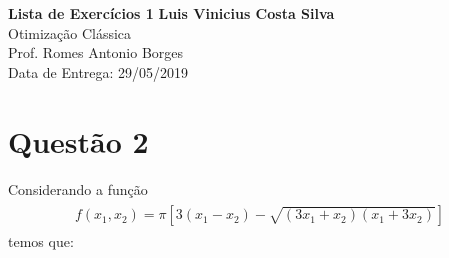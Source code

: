 \documentclass[fleqn, 11pt]{article}
\begin{document}
\noindent
\large\textbf{Lista de Exercícios 1} \hfill \textbf{Luis Vinicius Costa Silva} \\
\normalsize Otimização Clássica \\
Prof. Romes Antonio Borges \\
\hfill Data de Entrega: 29/05/2019






\section*{Questão 2}
Considerando a função
\begin{align*}
\begin{split}
f(x_1, x_2) = \pi [3(x_1-x_2)-\sqrt{(3x_1+x_2)(x_1+3x_2)}]
\end{split}
\end{align*}
temos que:
\end{document}
